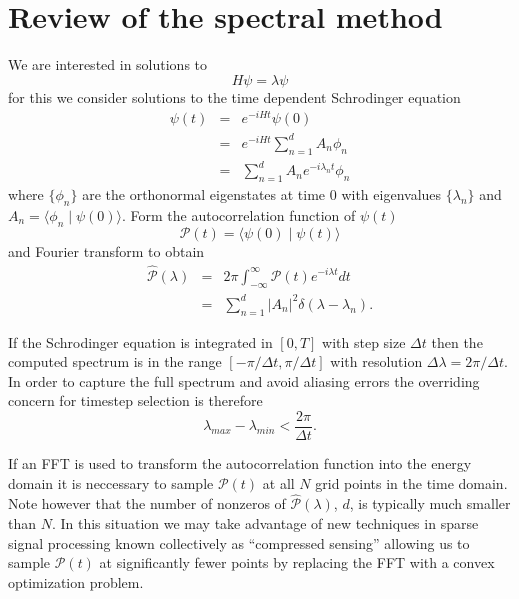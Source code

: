 \documentclass[10pt]{amsart}
\theoremstyle{remark}
\begin{document}
\section{Review of the spectral method}

We are interested in solutions to
\begin{equation}
H \psi = \lambda \psi
\end{equation}
for this we consider solutions to the time dependent Schrodinger equation
\begin{eqnarray}
\psi(t) &=& e^{-iHt}\psi(0) \\
&=& e^{-iHt} \sum_{n=1}^d A_n \phi_n \\ \label{timdepcoh}
&=& \sum_{n=1}^d A_n e^{-i\lambda_n t} \phi_n
\end{eqnarray}
where $\{ \phi_n \}$ are the orthonormal eigenstates at time 0 with eigenvalues $\{ \lambda_n \}$ and $A_n = \langle \phi_n \mid \psi(0) \rangle$. Form the autocorrelation function of $\psi(t)$
\begin{equation}\label{autocor}
\mathcal{P}(t) = \langle \psi(0) \mid \psi(t) \rangle
\end{equation}
and Fourier transform to obtain
\begin{eqnarray}
\hat{\mathcal{P}}(\lambda) &=& 2\pi \int_{-\infty}^\infty \mathcal{P}(t) e^{-i\lambda t}dt \\
\label{ftautocor}
&=& \sum_{n=1}^d |A_n|^2 \delta(\lambda - \lambda_n).
\end{eqnarray}

If the Schrodinger equation is integrated in $[0,T]$ with step size $\Delta t$ then the computed spectrum is in the range $[-\pi / \Delta t, \pi / \Delta t]$ with resolution $\Delta \lambda = 2\pi/\Delta t$. In order to capture the full spectrum and avoid aliasing errors the overriding concern for timestep selection is therefore
\begin{equation}
\lambda_{max} - \lambda_{min} < \frac{2\pi}{\Delta t}.
\end{equation}

If an FFT is used to transform the autocorrelation function into the energy domain it is neccessary to sample $\mathcal{P}(t)$ at all $N$ grid points in the time domain. Note however that the number of nonzeros of $\hat{\mathcal{P}}(\lambda)$, $d$, is typically much smaller than $N$. In this situation we may take advantage of new techniques in sparse signal processing known collectively as ``compressed sensing'' allowing us to sample $\mathcal{P}(t)$ at significantly fewer points by replacing the FFT with a convex optimization problem.
\end{document}
